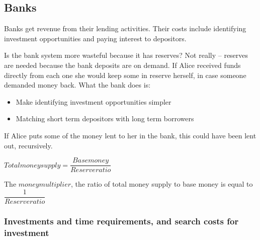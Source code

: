 
\subsection{Banks}

Banks get revenue from their lending activities. Their costs include identifying investment opportunities and paying interest to depositors.

Is the bank system more wasteful because it has reserves? Not really – reserves are needed because the bank deposits are on demand. If Alice received funds directly from each one she would keep some in reserve herself, in case someone demanded money back. What the bank does is:

\begin{itemize}
\item Make identifying investment opportunities simpler
\item Matching short term depositors with long term borrowers
\end{itemize}


If Alice puts some of the money lent to her in the bank, this could have been lent out, recursively.

\(Total money supply = \dfrac{Base money}{Reserve ratio}\)

The \(money multiplier\), the ratio of total money supply to base money is equal to \(\dfrac{1}{Reserve ratio}\)


\subsubsection{Investments and time requirements, and search costs for investment}

